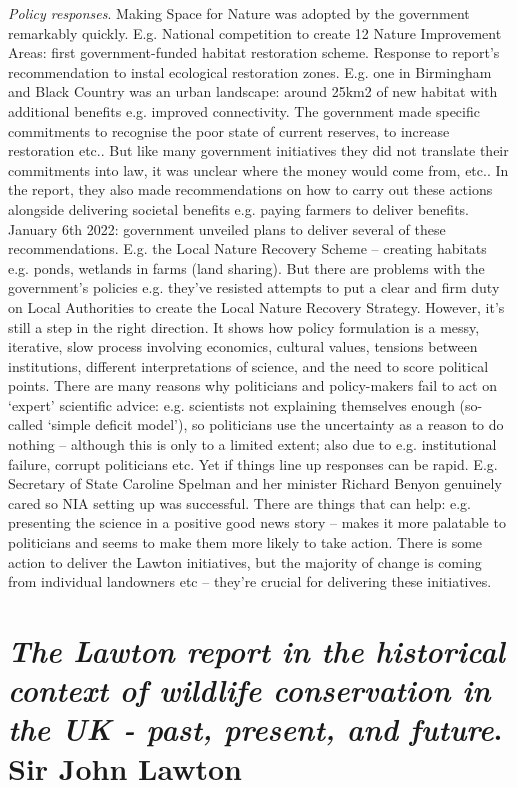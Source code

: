 \documentclass[9pt]{article}
\begin{document}
	\textit{Policy responses}. Making Space for Nature was adopted by the government remarkably quickly. E.g. National competition to create 12 Nature Improvement Areas: first government-funded habitat restoration scheme. Response to report's recommendation to instal ecological restoration zones. E.g. one in Birmingham and Black Country was an urban landscape: around 25km2 of new habitat with additional benefits e.g. improved connectivity. The government made specific commitments to recognise the poor state of current reserves, to increase restoration etc.. But like many government initiatives they did not translate their commitments into law, it was unclear where the money would come from, etc.. In the report, they also made recommendations on how to carry out these actions alongside delivering societal benefits e.g. paying farmers to deliver benefits. January 6th 2022: government unveiled plans to deliver several of these recommendations. E.g. the Local Nature Recovery Scheme – creating habitats e.g. ponds, wetlands in farms (land sharing). But there are problems with the government’s policies e.g. they’ve resisted attempts to put a clear and firm duty on Local Authorities to create the Local Nature Recovery Strategy. However, it’s still a step in the right direction. It shows how policy formulation is a messy, iterative, slow process involving economics, cultural values, tensions between institutions, different interpretations of science, and the need to score political points. There are many reasons why politicians and policy-makers fail to act on ‘expert’ scientific advice: e.g. scientists not explaining themselves enough (so-called ‘simple deficit model’), so politicians use the uncertainty as a reason to do nothing – although this is only to a limited extent; also due to e.g. institutional failure, corrupt politicians etc. Yet if things line up responses can be rapid. E.g. Secretary of State Caroline Spelman and her minister Richard Benyon genuinely cared so NIA setting up was successful. There are things that can help: e.g. presenting the science in a positive good news story – makes it more palatable to politicians and seems to make them more likely to take action. There is some action to deliver the Lawton initiatives, but the majority of change is coming from individual landowners etc – they’re crucial for delivering these initiatives.
	
	
	\section{\textit{The Lawton report in the historical context of wildlife conservation in the UK - past, present, and future}. Sir John Lawton}
	
\end{document}
